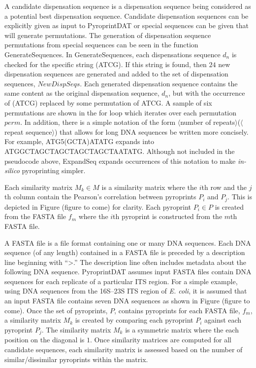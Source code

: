 \documentclass[12pt]{ucthesis}
\begin{document}
      A candidate dispensation sequence is a dispensation sequence being
      considered as a potential best dispensation sequence. Candidate
      dispensation sequences can be explicitly given as input to PyroprintDAT or
      special sequences can be given that will generate permutations. The
      generation of dispensation sequence permutations from special sequences can
      be seen in the function \textsf{GenerateSequences}. In
      \textsf{GenerateSequences}, each dispensations sequence $d_n$ is checked for
      the specific string \textnormal{(ATCG)}. If this string is found, then $24$
      new dispensation sequences are generated and added to the set of
      dispensation sequences, $NewDispSeqs$. Each generated dispensation sequence
      contains the same content as the original dispensation sequence, $d_n$, but
      with the occurrence of \textnormal{(ATCG)} replaced by some permutation of
      \textnormal{ATCG}. A sample of six permutations are shown in the for loop
      which iterates over each permutation $perm$. In addition, there is a simple
      notation of the form \textnormal{$\langle$number of
      repeats$\rangle$($\langle$repeat sequence$\rangle$)} that allows for long
      DNA sequences be written more concisely.  For example,
      \textnormal{ATG5(GCTA)ATATG} expands into
      \textnormal{ATGGCTAGCTAGCTAGCTAGCTAATATG}. Although not included in the
      pseudocode above, \textsf{ExpandSeq} expands occurrences of this notation to
      make \textit{in-silico} pyroprinting simpler.
      
      Each similarity matrix $M_k \in M$ is a similarity matrix where the $i$th row
      and the $j$th column contain the Pearson's correlation between pyroprints
      $P_i$ and $P_j$. This is depicted in Figure (figure to come) for clarity.
      Each pyroprint $P_i \in P$ is created from the FASTA file $f_m$ where the
      $i$th pyroprint is constructed from the $m$th FASTA file.
      
      A FASTA file is a file format containing one or many DNA sequences. Each DNA
      sequence (of any length) contained in a FASTA file is preceded by a
      description line beginning with ``\textgreater.'' The description line often includes
      metadata about the following DNA sequence. PyroprintDAT assumes input FASTA
      files contain DNA sequences for each replicate of a particular ITS region.
      For a simple example, using DNA sequences from the 16S--23S ITS region of
      \textit{E. coli}, it is assumed that an input FASTA file contains seven DNA
      sequences as shown in Figure (figure to come). Once the set of pyroprints,
      $P$, contains pyroprints for each FASTA file, $f_m$, a similarity matrix
      $M_k$ is created by comparing each pyroprint $P_i$ against each pyroprint
      $P_j$. The similarity matrix $M_k$ is a symmetric matrix where the each
      position on the diagonal is $1$. Once similarity matrices are computed for
      all candidate sequences, each similarity matrix is assessed based on the
      number of similar/dissimilar pyroprints within the matrix.
\end{document}
